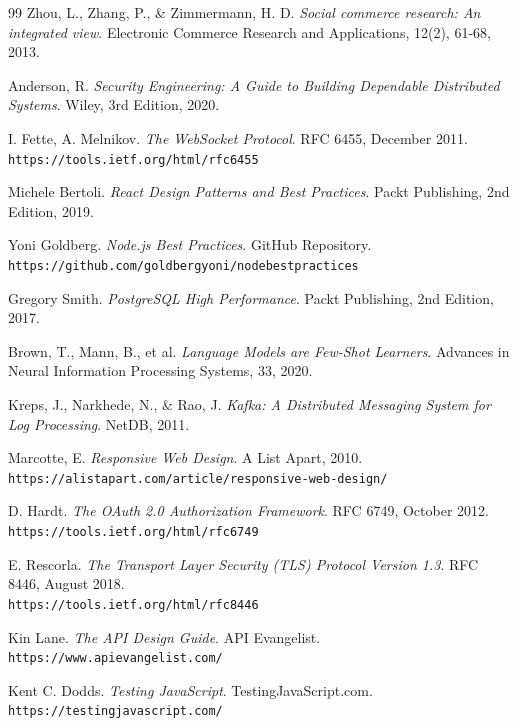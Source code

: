 \begin{thebibliography}{99}
Zhou, L., Zhang, P., \& Zimmermann, H. D. \textit{Social commerce research: An integrated view}. Electronic Commerce Research and Applications, 12(2), 61-68, 2013.

Anderson, R. \textit{Security Engineering: A Guide to Building Dependable Distributed Systems}. Wiley, 3rd Edition, 2020.

I. Fette, A. Melnikov. \textit{The WebSocket Protocol}. RFC 6455, December 2011. \\
\texttt{https://tools.ietf.org/html/rfc6455}

Michele Bertoli. \textit{React Design Patterns and Best Practices}. Packt Publishing, 2nd Edition, 2019.

Yoni Goldberg. \textit{Node.js Best Practices}. GitHub Repository. \\
\texttt{https://github.com/goldbergyoni/nodebestpractices}

Gregory Smith. \textit{PostgreSQL High Performance}. Packt Publishing, 2nd Edition, 2017.

Brown, T., Mann, B., et al. \textit{Language Models are Few-Shot Learners}. Advances in Neural Information Processing Systems, 33, 2020.

Kreps, J., Narkhede, N., \& Rao, J. \textit{Kafka: A Distributed Messaging System for Log Processing}. NetDB, 2011.

Marcotte, E. \textit{Responsive Web Design}. A List Apart, 2010. \\
\texttt{https://alistapart.com/article/responsive-web-design/}

D. Hardt. \textit{The OAuth 2.0 Authorization Framework}. RFC 6749, October 2012. \\
\texttt{https://tools.ietf.org/html/rfc6749}

E. Rescorla. \textit{The Transport Layer Security (TLS) Protocol Version 1.3}. RFC 8446, August 2018. \\
\texttt{https://tools.ietf.org/html/rfc8446}

Kin Lane. \textit{The API Design Guide}. API Evangelist. \\
\texttt{https://www.apievangelist.com/}

Kent C. Dodds. \textit{Testing JavaScript}. TestingJavaScript.com. \\
\texttt{https://testingjavascript.com/}


\end{thebibliography}
